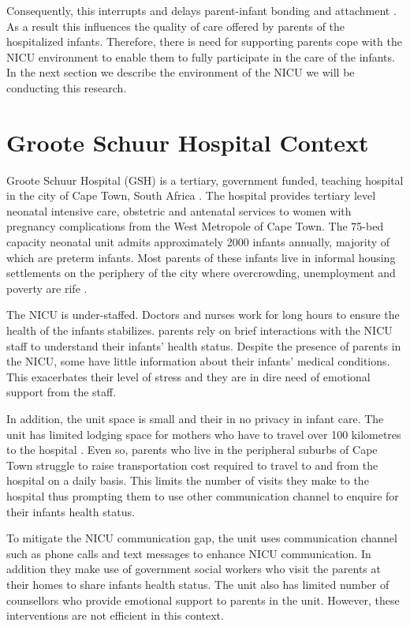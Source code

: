 Consequently, this interrupts and delays parent-infant bonding and attachment \citep{Heidari2017}. As a result this influences the quality of care offered by parents of the hospitalized infants. Therefore, there is need for supporting parents cope with the NICU environment to enable them to fully participate in the care of the infants. In the next section we describe the environment of the NICU we will be conducting this research.

\section {Groote Schuur Hospital Context}
Groote Schuur Hospital (GSH) is a tertiary, government funded, teaching hospital in the city of Cape Town, South Africa \citep{WesternCapeGovernment2014}. The hospital provides tertiary level neonatal intensive care, obstetric and antenatal services to women with pregnancy complications from the West Metropole of Cape Town. The 75-bed capacity neonatal unit admits approximately 2000 infants annually, majority of which are preterm infants. Most parents of these infants live in informal housing settlements on the periphery of the city where overcrowding, unemployment and poverty are rife \citep{Thompson1993}. 

The NICU is under-staffed. Doctors and nurses work for long hours to ensure the health of the infants stabilizes. parents rely on brief interactions with the NICU staff to understand their infants' health status. Despite the presence of parents in the NICU, some have little information about their infants' medical conditions. This exacerbates their level of stress and they are in dire need of emotional support from the staff. 

In addition, the unit space is small and their in no privacy in infant care. The unit has limited lodging space for mothers who have to travel over 100 kilometres to the hospital \citep{Kapembwa2017}. Even so, parents who live in the peripheral suburbs of Cape Town struggle to raise transportation cost required to travel to and from the hospital on a daily basis. This limits the number of visits they make to the hospital thus prompting them to use other communication channel to enquire for their infants health status.

To mitigate the NICU communication gap, the unit uses communication channel such as phone calls and text messages to enhance NICU communication. In addition they make use of government social workers who visit the parents at their homes to share infants health status. The unit also has limited number of counsellors who provide emotional support to parents in the unit.
However, these interventions are not efficient in this context.

